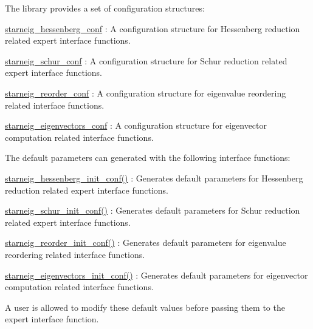The library provides a set of configuration structures\+:


\begin{DoxyItemize}
\item \mbox{\hyperlink{group__starneig__ex__conf_structstarneig__hessenberg__conf}{starneig\+\_\+hessenberg\+\_\+conf}} \+: A configuration structure for Hessenberg reduction related expert interface functions.
\item \mbox{\hyperlink{group__starneig__ex__conf_structstarneig__schur__conf}{starneig\+\_\+schur\+\_\+conf}} \+: A configuration structure for Schur reduction related expert interface functions.
\item \mbox{\hyperlink{group__starneig__ex__conf_structstarneig__reorder__conf}{starneig\+\_\+reorder\+\_\+conf}} \+: A configuration structure for eigenvalue reordering related interface functions.
\item \mbox{\hyperlink{group__starneig__ex__conf_structstarneig__eigenvectors__conf}{starneig\+\_\+eigenvectors\+\_\+conf}} \+: A configuration structure for eigenvector computation related interface functions.
\end{DoxyItemize}

The default parameters can generated with the following interface functions\+:


\begin{DoxyItemize}
\item \mbox{\hyperlink{group__starneig__ex__conf_ga83442bbb1fd14c98adc3df476c8e666a}{starneig\+\_\+hessenberg\+\_\+init\+\_\+conf()}} \+: Generates default parameters for Hessenberg reduction related expert interface functions.
\item \mbox{\hyperlink{group__starneig__ex__conf_ga51b79bd8843d3da682b958275c17c6c5}{starneig\+\_\+schur\+\_\+init\+\_\+conf()}} \+: Generates default parameters for Schur reduction related expert interface functions.
\item \mbox{\hyperlink{group__starneig__ex__conf_gab86bd857deebc15822ebf1d340df63a8}{starneig\+\_\+reorder\+\_\+init\+\_\+conf()}} \+: Generates default parameters for eigenvalue reordering related interface functions.
\item \mbox{\hyperlink{group__starneig__ex__conf_ga567fb1da574a2a4dd01d8421dadbd8f4}{starneig\+\_\+eigenvectors\+\_\+init\+\_\+conf()}} \+: Generates default parameters for eigenvector computation related interface functions.
\end{DoxyItemize}

A user is allowed to modify these default values before passing them to the expert interface function.

